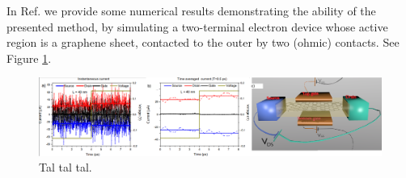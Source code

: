 \documentclass[11pt, a4paper]{article} %
\begin{document}
In Ref. \cite{Thz} we provide some numerical results demonstrating the ability of the presented method, by simulating a two-terminal electron device whose active region is a graphene sheet, contacted to the outer by two (ohmic) contacts. See Figure \ref{fig:fig}. %
\begin{figure}[h!]
  \centering
  \hspace*{-0.5cm}
    \includegraphics[width=1.05\linewidth]{Figures/abc.png}
   \caption{Tal tal tal.}
  \label{fig:fig}
\end{figure}

\end{document}
